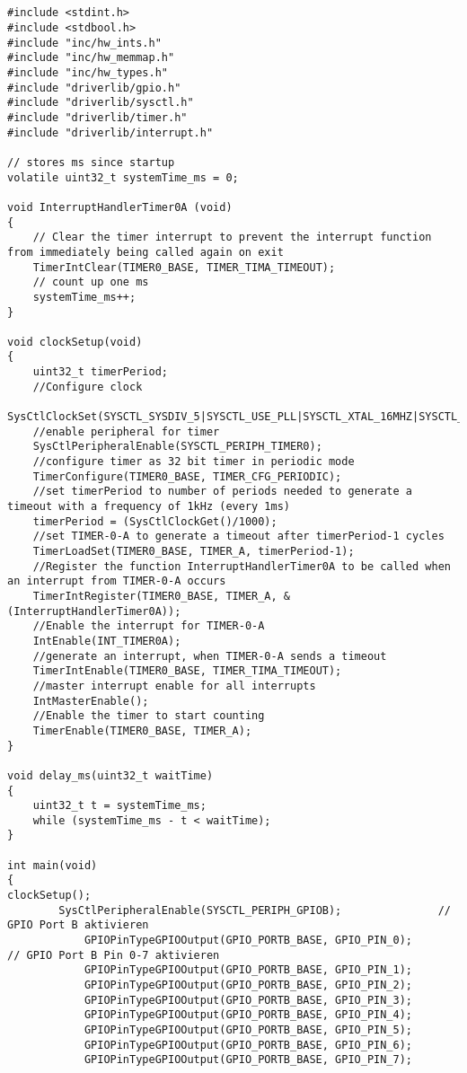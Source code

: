 \subsection{}
\begin{lstlisting}
#include <stdint.h>
#include <stdbool.h>
#include "inc/hw_ints.h"
#include "inc/hw_memmap.h"
#include "inc/hw_types.h"
#include "driverlib/gpio.h"
#include "driverlib/sysctl.h"
#include "driverlib/timer.h"
#include "driverlib/interrupt.h"

// stores ms since startup
volatile uint32_t systemTime_ms = 0;

void InterruptHandlerTimer0A (void)
{
    // Clear the timer interrupt to prevent the interrupt function from immediately being called again on exit
    TimerIntClear(TIMER0_BASE, TIMER_TIMA_TIMEOUT);
    // count up one ms
    systemTime_ms++;
}

void clockSetup(void)
{
    uint32_t timerPeriod;
    //Configure clock
    SysCtlClockSet(SYSCTL_SYSDIV_5|SYSCTL_USE_PLL|SYSCTL_XTAL_16MHZ|SYSCTL_OSC_MAIN);
    //enable peripheral for timer
    SysCtlPeripheralEnable(SYSCTL_PERIPH_TIMER0);
    //configure timer as 32 bit timer in periodic mode
    TimerConfigure(TIMER0_BASE, TIMER_CFG_PERIODIC);
    //set timerPeriod to number of periods needed to generate a timeout with a frequency of 1kHz (every 1ms)
    timerPeriod = (SysCtlClockGet()/1000);
    //set TIMER-0-A to generate a timeout after timerPeriod-1 cycles
    TimerLoadSet(TIMER0_BASE, TIMER_A, timerPeriod-1);
    //Register the function InterruptHandlerTimer0A to be called when an interrupt from TIMER-0-A occurs
    TimerIntRegister(TIMER0_BASE, TIMER_A, &(InterruptHandlerTimer0A));
    //Enable the interrupt for TIMER-0-A
    IntEnable(INT_TIMER0A);
    //generate an interrupt, when TIMER-0-A sends a timeout
    TimerIntEnable(TIMER0_BASE, TIMER_TIMA_TIMEOUT);
    //master interrupt enable for all interrupts
    IntMasterEnable();
    //Enable the timer to start counting
    TimerEnable(TIMER0_BASE, TIMER_A);
}

void delay_ms(uint32_t waitTime)
{
    uint32_t t = systemTime_ms;
    while (systemTime_ms - t < waitTime);
}

int main(void)
{
clockSetup();
        SysCtlPeripheralEnable(SYSCTL_PERIPH_GPIOB);               // GPIO Port B aktivieren
            GPIOPinTypeGPIOOutput(GPIO_PORTB_BASE, GPIO_PIN_0);         // GPIO Port B Pin 0-7 aktivieren
            GPIOPinTypeGPIOOutput(GPIO_PORTB_BASE, GPIO_PIN_1);
            GPIOPinTypeGPIOOutput(GPIO_PORTB_BASE, GPIO_PIN_2);
            GPIOPinTypeGPIOOutput(GPIO_PORTB_BASE, GPIO_PIN_3);
            GPIOPinTypeGPIOOutput(GPIO_PORTB_BASE, GPIO_PIN_4);
            GPIOPinTypeGPIOOutput(GPIO_PORTB_BASE, GPIO_PIN_5);
            GPIOPinTypeGPIOOutput(GPIO_PORTB_BASE, GPIO_PIN_6);
            GPIOPinTypeGPIOOutput(GPIO_PORTB_BASE, GPIO_PIN_7);


\end{lstlisting}
